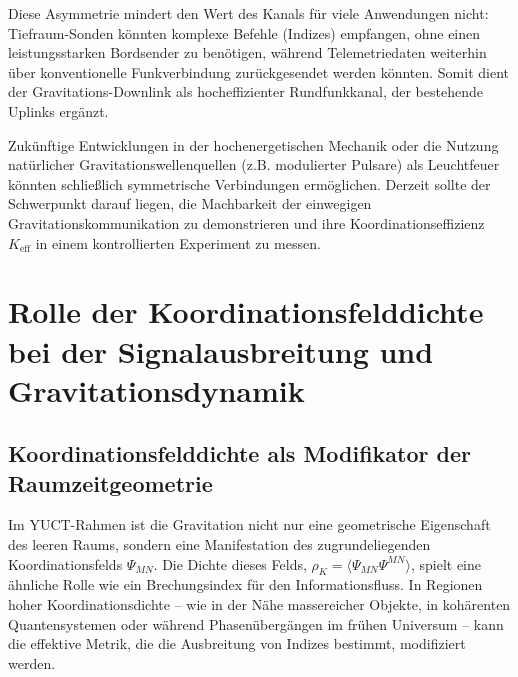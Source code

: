 \documentclass[12pt,a4paper]{article}
\begin{document}
	Diese Asymmetrie mindert den Wert des Kanals für viele Anwendungen nicht: Tiefraum-Sonden könnten komplexe Befehle (Indizes) empfangen, ohne einen leistungsstarken Bordsender zu benötigen, während Telemetriedaten weiterhin über konventionelle Funkverbindung zurückgesendet werden könnten. Somit dient der Gravitations-Downlink als hocheffizienter Rundfunkkanal, der bestehende Uplinks ergänzt.
	
	Zukünftige Entwicklungen in der hochenergetischen Mechanik oder die Nutzung natürlicher Gravitationswellenquellen (z.B. modulierter Pulsare) als Leuchtfeuer könnten schließlich symmetrische Verbindungen ermöglichen. Derzeit sollte der Schwerpunkt darauf liegen, die Machbarkeit der einwegigen Gravitationskommunikation zu demonstrieren und ihre Koordinationseffizienz \(K_{\mathrm{eff}}\) in einem kontrollierten Experiment zu messen.
	
	\section{Rolle der Koordinationsfelddichte bei der Signalausbreitung und Gravitationsdynamik}
	\label{sec:coord-density}
	
	\subsection{Koordinationsfelddichte als Modifikator der Raumzeitgeometrie}
	
	Im YUCT-Rahmen ist die Gravitation nicht nur eine geometrische Eigenschaft des leeren Raums, sondern eine Manifestation des zugrundeliegenden Koordinationsfelds \(\Psi_{MN}\). Die Dichte dieses Felds, \(\rho_K = \langle \Psi_{MN}\Psi^{MN} \rangle\), spielt eine ähnliche Rolle wie ein Brechungsindex für den Informationsfluss. In Regionen hoher Koordinationsdichte – wie in der Nähe massereicher Objekte, in kohärenten Quantensystemen oder während Phasenübergängen im frühen Universum – kann die effektive Metrik, die die Ausbreitung von Indizes bestimmt, modifiziert werden.
	
\end{document}
